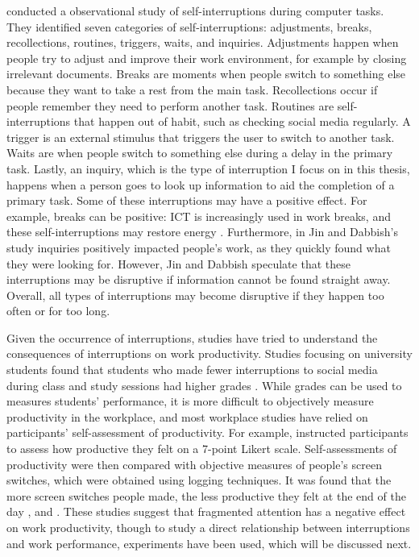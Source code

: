 \citet{Jin2009} conducted a observational study of self-interruptions during computer tasks. They identified seven categories of self-interruptions: adjustments, breaks, recollections, routines, triggers, waits, and inquiries. Adjustments happen when people try to adjust and improve their work environment, for example by closing irrelevant documents. Breaks are moments when people switch to something else because they want to take a rest from the main task. Recollections occur if people remember they need to perform another task. Routines are self-interruptions that happen out of habit, such as checking social media regularly. A trigger is an external stimulus that triggers the user to switch to another task. Waits are when people switch to something else during a delay in the primary task. Lastly, an inquiry, which is the type of interruption I focus on in this thesis, happens when a person goes to look up information to aid the completion of a primary task. Some of these interruptions may have a positive effect. For example, breaks can be positive: ICT is increasingly used in work breaks, and these self-interruptions may restore energy \citep{Skatova2016}. Furthermore, in Jin and Dabbish's study inquiries positively impacted people's work, as they quickly found what they were looking for. However, Jin and Dabbish speculate that these interruptions may be disruptive if information cannot be found straight away. Overall, all types of interruptions may become disruptive if they happen too often or for too long.

Given the occurrence of interruptions, studies have tried to understand the consequences of interruptions on work productivity. Studies focusing on university students found that students who made fewer interruptions to social media during class and study sessions had higher grades \citep{Carrier2015}. While grades can be used to measures students' performance, it is more difficult to objectively measure productivity in the workplace, and most workplace studies have relied on participants' self-assessment of productivity. For example, \citet{Mark2015} instructed participants to assess how productive they felt on a 7-point Likert scale. %
Self-assessments of productivity were then compared with objective measures of people's screen switches, which were obtained using logging techniques. It was found that the more screen switches people made, the less productive they felt at the end of the day \citep{Mark2015}, and . 
These studies suggest that fragmented attention has a negative effect on work productivity, though to study a direct relationship between interruptions and work performance, experiments have been used, which will be discussed next. 

